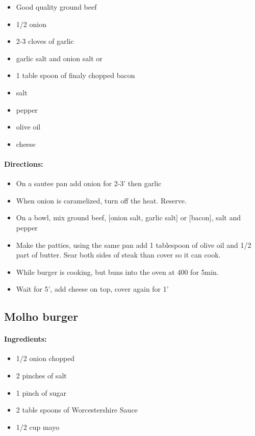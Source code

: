 \documentclass{article}
\begin{document}
\begin{itemize}
	\item Good quality ground beef
	\item 1/2 onion
	\item 2-3 cloves of garlic
	\item garlic salt and onion salt or
	\item 1 table spoon of finaly chopped bacon
	\item salt
	\item pepper
	\item olive oil
	\item cheese
\end{itemize}

\paragraph{Directions:}
\begin{itemize}
	\item On a sautee pan add onion for 2-3' then garlic
	\item When onion is caramelized, turn off the heat. Reserve.
	\item On a bowl, mix ground beef, [onion salt, garlic salt] or [bacon], salt and pepper
	\item Make the patties, using the same pan add 1 tablespoon of olive oil and 1/2 part of butter. Sear both sides of steak than cover so it can cook.
	\item While burger is cooking, but buns into the oven at 400 for 5min.
	\item Wait for 5', add cheese on top, cover again for 1'
\end{itemize} 

\subsection{Molho burger}

\paragraph{Ingredients:}
\begin{itemize}
	\item 1/2 onion chopped
	\item 2 pinches of salt
	\item 1 pinch of sugar
	\item 2 table spoons of Worcestershire Sauce
	\item 1/2 cup mayo
\end{itemize}
\end{document}
